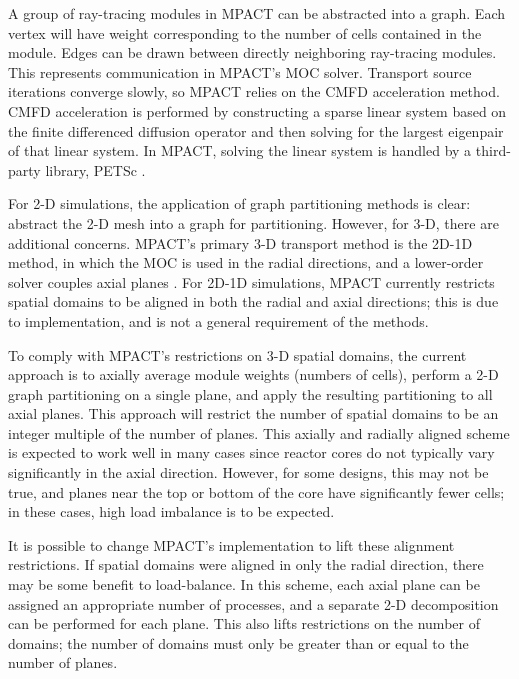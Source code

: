{{    A group of ray-tracing modules in MPACT can be abstracted into a graph.
    Each vertex will have weight corresponding to the number of cells contained in the module.
    Edges can be drawn between directly neighboring ray-tracing modules.
    This represents communication in MPACT's \ac{MOC} solver.
    Transport source iterations converge slowly, so MPACT relies on the \ac{CMFD} \cite{Smith1983} acceleration method.
    \ac{CMFD} acceleration is performed by constructing a sparse linear system based on the finite differenced diffusion operator and then solving for the largest eigenpair of that linear system.
    In MPACT, solving the linear system is handled by a third-party library, PETSc \cite{Petsc}.

    For 2-D simulations, the application of graph partitioning methods is clear: abstract the 2-D mesh into a graph for partitioning.
    However, for 3-D, there are additional concerns.
    MPACT's primary 3-D transport method is the 2D-1D method, in which the \ac{MOC} is used in the radial directions, and a lower-order solver couples axial planes \cite{Collins2016}.
    For 2D-1D simulations, MPACT currently restricts spatial domains to be aligned in both the radial and axial directions; this is due to implementation, and is not a general requirement of the methods.

    To comply with MPACT's restrictions on 3-D spatial domains, the current approach is to axially average module weights (numbers of cells), perform a 2-D graph partitioning on a single plane, and apply the resulting partitioning to all axial planes.
    This approach will restrict the number of spatial domains to be an integer multiple of the number of planes.
    This axially and radially aligned scheme is expected to work well in many cases since reactor cores do not typically vary significantly in the axial direction.
    However, for some designs, this may not be true, and planes near the top or bottom of the core have significantly fewer cells; in these cases, high load imbalance is to be expected.

    It is possible to change MPACT's implementation to lift these alignment restrictions.
    If spatial domains were aligned in only the radial direction, there may be some benefit to load-balance.
    In this scheme, each axial plane can be assigned an appropriate number of processes, and a separate 2-D decomposition can be performed for each plane.
    This also lifts restrictions on the number of domains; the number of domains must only be greater than or equal to the number of planes.

}}

